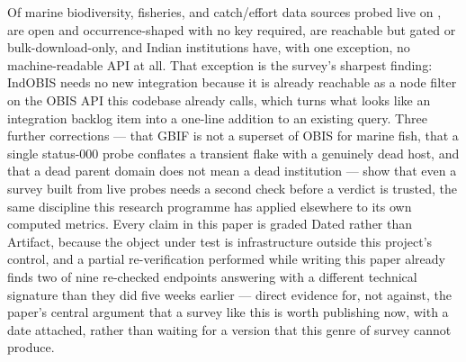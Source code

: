 Of \NSourcesSurveyed{} marine biodiversity, fisheries, and catch/effort data
sources probed live on \ProbeDate{}, \NTierOne{} are open and
occurrence-shaped with no key required, \NTierTwo{} are reachable but gated
or bulk-download-only, and \NTierThree{} Indian institutions have, with one
exception, no machine-readable API at all. That exception is the survey's
sharpest finding: IndOBIS needs no new integration because it is already
reachable as a node filter on the OBIS API this codebase already calls, which
turns what looks like an integration backlog item into a one-line addition
to an existing query. Three further corrections --- that GBIF is not a
superset of OBIS for marine fish, that a single status-000 probe conflates a
transient flake with a genuinely dead host, and that a dead parent domain
does not mean a dead institution --- show that even a survey built from live
probes needs a second check before a verdict is trusted, the same discipline
this research programme has applied elsewhere to its own computed metrics.
Every claim in this paper is graded Dated rather than Artifact, because the
object under test is infrastructure outside this project's control, and a
partial re-verification performed while writing this paper already finds
two of nine re-checked endpoints answering with a different technical
signature than they did five weeks earlier --- direct evidence for, not
against, the paper's central argument that a survey like this is worth
publishing now, with a date attached, rather than waiting for a version that
this genre of survey cannot produce.
